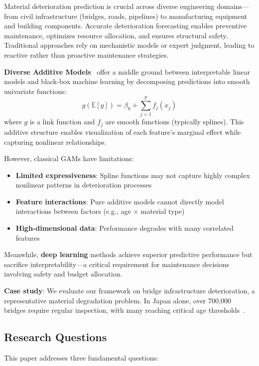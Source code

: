 \documentclass[twocolumn]{article}
\begin{document}
Material deterioration prediction is crucial across diverse engineering domains—from civil infrastructure (bridges, roads, pipelines) to manufacturing equipment and building components. Accurate deterioration forecasting enables preventive maintenance, optimizes resource allocation, and ensures structural safety. Traditional approaches rely on mechanistic models or expert judgment, leading to reactive rather than proactive maintenance strategies.

\textbf{Diverse Additive Models}~\cite{hastie1990gam,wood2017gam} offer a middle ground between interpretable linear models and black-box machine learning by decomposing predictions into smooth univariate functions:
\begin{equation}
g(\mathbb{E}[y]) = \beta_0 + \sum_{j=1}^{p} f_j(x_j)
\end{equation}
where $g$ is a link function and $f_j$ are smooth functions (typically splines). This additive structure enables visualization of each feature's marginal effect while capturing nonlinear relationships.

However, classical GAMs have limitations:
\begin{itemize}
\item \textbf{Limited expressiveness}: Spline functions may not capture highly complex nonlinear patterns in deterioration processes
\item \textbf{Feature interactions}: Pure additive models cannot directly model interactions between factors (e.g., age $\times$ material type)
\item \textbf{High-dimensional data}: Performance degrades with many correlated features
\end{itemize}

Meanwhile, \textbf{deep learning} methods achieve superior predictive performance but sacrifice interpretability—a critical requirement for maintenance decisions involving safety and budget allocation.

\textbf{Case study}: We evaluate our framework on bridge infrastructure deterioration, a representative material degradation problem. In Japan alone, over 700,000 bridges require regular inspection, with many reaching critical age thresholds~\cite{mlit2020bridge}.

\subsection{Research Questions}

This paper addresses three fundamental questions:
\end{document}
